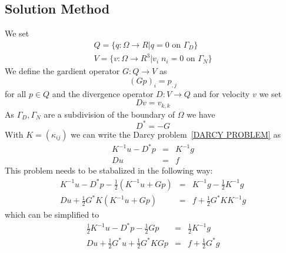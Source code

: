 \subsection{Solution Method \label{DARCY SOLVE}}
We set 
\begin{align}
Q=\{ q: \Omega \to R | q = 0 \mbox{ on } \Gamma_{D} \} \label{DARCY SPACE P} \\
V=\{ v: \Omega \to R^3 |v_{i}  \; n_{i}  =0 \mbox{ on }  \Gamma_{N}  \} \label{DARCY SPACE P} 
\end{align}
We define the gardient operator $G: Q \to V$ as
\begin{equation}
(Gp)_{i} =  p_{,j}
\end{equation}
for all $p \in Q$ and the 
divergence operator $D: V \to Q$
and for velocity $v$ we set
\begin{equation}
Dv = v_{k,k}
\end{equation}
As $\Gamma_{D}, \Gamma_{N}$ are a subdivision of the boundary of $\Omega$ we have
\begin{equation}
D^*= - G
\end{equation}
With $K=(\kappa_{ij})$ we can write the Darcy problem~\ref{DARCY PROBLEM} as
\begin{equation}
\begin{array}{rcl}
K^{-1} u - D^* p & = & K^{-1} g \\
Du & = & f 
\end{array}
\end{equation} 
This problem needs to be stabalized in the following way:
\begin{equation}
\begin{array}{rcl}
K^{-1} u - D^* p - \frac{1}{2} \left( K^{-1} u +G  p \right) & = & K^{-1} g - \frac{1}{2} K^{-1} g \\
Du + \frac{1}{2} G^* K \left( K^{-1} u +G  p \right) & = & f + \frac{1}{2} G^* K K^{-1} g
\end{array}
\end{equation} 
which can be simplified to
\begin{equation}
\begin{array}{rcl}
\frac{1}{2}  K^{-1} u - D^* p - \frac{1}{2} G  p & = & \frac{1}{2} K^{-1} g \\
Du + \frac{1}{2} G^* u + \frac{1}{2} G^* K G  p  & = & f + \frac{1}{2} G^* g
\end{array}
\end{equation} 



